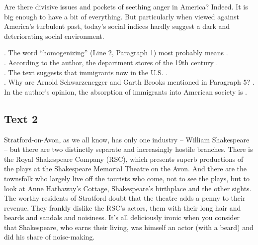 Are there divisive issues and pockets of seething anger in America? Indeed. It is big enough to have a bit of everything. But particularly when viewed against America’s turbulent past, today’s social indices hardly suggest a dark and deteriorating social environment.
\begin{questions}  .	The word “homogenizing” (Line 2, Paragraph 1) most probably means \ltk{}.\\
 .	According to the author, the department stores of the 19th century \ltk{}.\\
.	The text suggests that immigrants now in the U.S. \ltk{}.\\
 .	Why are Arnold Schwarzenegger and Garth Brooks mentioned in Paragraph 5?
 .	In the author’s opinion, the absorption of immigrants into American society is \ltk{}.\\
\end{questions}    \subsection{Text 2}
Stratford-on-Avon, as we all know, has only one industry -- William Shakespeare -- but there are two distinctly separate and increasingly hostile branches. There is the Royal Shakespeare Company (RSC), which presents superb productions of the plays at the Shakespeare Memorial Theatre on the Avon. And there are the townsfolk who largely live off the tourists who come, not to see the plays, but to look at Anne Hathaway’s Cottage, Shakespeare’s birthplace and the other sights.
The worthy residents of Stratford doubt that the theatre adds a penny to their revenue. They frankly dislike the RSC’s actors, them with their long hair and beards and sandals and noisiness. It’s all deliciously ironic when you consider that Shakespeare, who earns their living, was himself an actor (with a beard) and did his share of noise-making.
